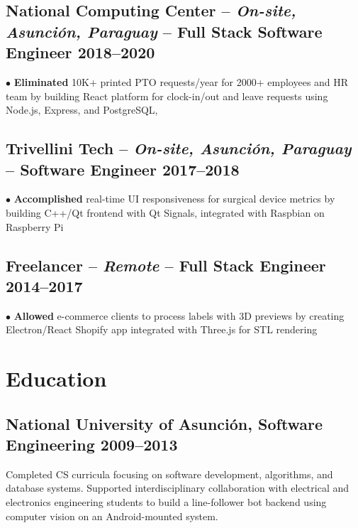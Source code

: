 \documentclass[10pt,a4paper]{article}
\newcommand{\actionverb}[1]{\textcolor{actioncolor}{\textbf{#1}}}
\newcommand{\cvsinglecompany}[5]{
  \subsection{#1 \textcolor{mediumgray}{#2} -- \textbf{\small #3} \hfill {\footnotesize\textcolor{mediumgray}{#4}}}
  {\footnotesize #5}
  \vspace{0.2em}
}
\newcommand{\cveducation}[4]{
  \subsection{#1, \textbf{\small #2} \hfill {\footnotesize\textcolor{mediumgray}{#3}}}
  {\footnotesize #4}
}
\begin{document}
\cvsinglecompany{National Computing Center}{-- \textit{On-site, Asunción, Paraguay}}{Full Stack Software Engineer}{2018--2020}{
$\bullet$ \actionverb{Eliminated} 10K+ printed PTO requests/year for 2000+ employees and HR team by building React platform for clock-in/out and leave requests using Node.js, Express, and PostgreSQL, 
}

\cvsinglecompany{Trivellini Tech}{-- \textit{On-site, Asunción, Paraguay}}{Software Engineer}{2017--2018}{
$\bullet$ \actionverb{Accomplished} real-time UI responsiveness for surgical device metrics by building C++/Qt frontend with Qt Signals, integrated with Raspbian on Raspberry Pi
}

\cvsinglecompany{Freelancer}{-- \textit{Remote}}{Full Stack Engineer}{2014--2017}{
$\bullet$ \actionverb{Allowed} e-commerce clients to process labels with 3D previews by creating Electron/React Shopify app integrated with Three.js for STL rendering
}




\section{Education}
\cveducation{National University of Asunción}{Software Engineering}{2009--2013}{Completed CS curricula focusing on software development, algorithms, and database systems. Supported interdisciplinary collaboration with electrical and electronics engineering students to build a line-follower bot backend using computer vision on an Android-mounted system.}
\end{document}
